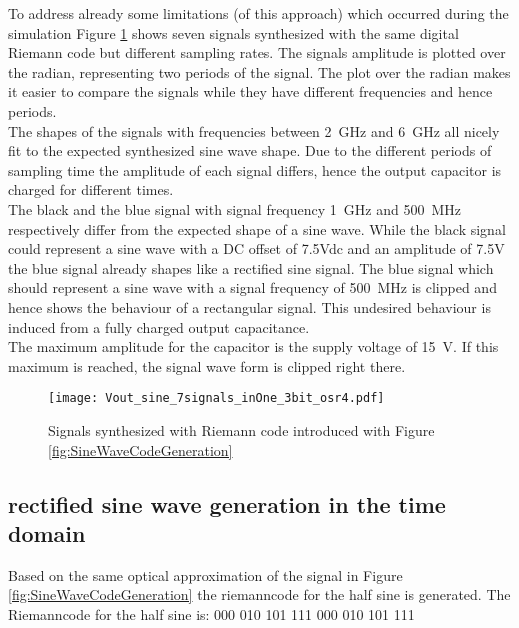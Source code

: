 To address already some limitations (of this approach) which occurred during the simulation Figure \ref{fig:7SignalsSameSlopeInOnePlot} shows seven signals synthesized with the same digital Riemann code but different sampling rates.
The signals amplitude is plotted over the radian, representing two periods of the signal.
The plot over the radian makes it easier to compare the signals while they have different frequencies and hence periods.\\
The shapes of the signals with frequencies between \SI{2}{\GHz} and \SI{6}{\GHz} all nicely fit to the expected synthesized sine wave shape. Due to the different periods of sampling time the amplitude of each signal differs, hence the output capacitor is charged for different times.\\
The black and the blue signal with signal frequency \SI{1}{\GHz} and  \SI{500}{\MHz} respectively differ from the expected shape of a sine wave. While the black signal could represent a sine wave with a DC offset of 7.5Vdc and an amplitude of 7.5V the blue signal already shapes like a rectified sine signal. The blue signal which should represent a sine wave with a signal frequency of \SI{500}{\MHz} is clipped and hence shows the behaviour of a rectangular signal. This undesired behaviour is induced from a fully charged output capacitance. \\
The maximum amplitude for the capacitor is the supply voltage of \SI{15}{\volt}. If this maximum is reached, the signal wave form is clipped right there.




\begin{figure}[htb!]
   \centering
   \texttt{[image: Vout\_sine\_7signals\_inOne\_3bit\_osr4.pdf]}
   \caption{Signals synthesized with Riemann code introduced with Figure \ref{fig:SineWaveCodeGeneration}}
   \label{fig:7SignalsSameSlopeInOnePlot}
\end{figure}

\subsection{rectified sine wave generation in the time domain}
Based on the same optical approximation of the signal in Figure \ref{fig:SineWaveCodeGeneration} the riemanncode for the half sine is generated. The Riemanncode for the half sine is: 000 010 101 111 000 010 101 111
